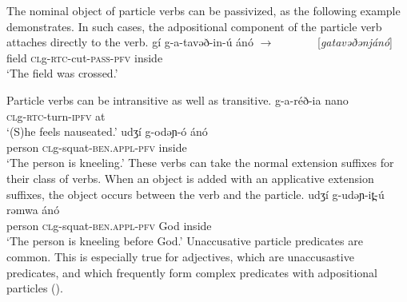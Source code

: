 The nominal object of particle verbs can be passivized, as the following example demonstrates. In such cases, the adpositional component of the particle verb attaches directly to the verb. 
\ea \gll gí g-a-tavəð-in-ú ánó $\to$ {\ \ \ \ \ \ \ [\textit{gatavəðənjánó}]}\\
 		field \textsc{cl}g-\textsc{rtc-}cut-\textsc{pass-pfv} inside {} {} \\
	\glt `The field was crossed.'
\z 

Particle verbs can be intransitive as well as transitive.
\ea \gll g-a-réð-ia nano\\ 
\textsc{cl}g-\textsc{rtc-}turn-\textsc{ipfv} at \\
\glt	`(S)he feels nauseated.'
\ex \gll 	udʒí g-odəɲ-ó ánó\\
			person \textsc{cl}g-squat-\textsc{ben.appl-pfv} inside \\
	\glt  	`The person is kneeling.'
\z 
These verbs can take the normal extension suffixes for their class of verbs. When an object is added with an applicative extension suffixes, the object occurs between the verb and the particle. 
\ea \gll 	udʒí g-udəɲ-it̪-ú rəmwa ánó\\
			person \textsc{cl}g-squat-\textsc{ben.appl-pfv} God  inside \\
	\glt  	`The person is kneeling before God.' \label{ex:ch12:vpart2}
\z 
Unaccusative particle predicates are common. This is especially true for adjectives, which are unaccusastive predicates, and which frequently form complex predicates with adpositional particles ().



%
%
%
%
%
%
%
%
%
%


